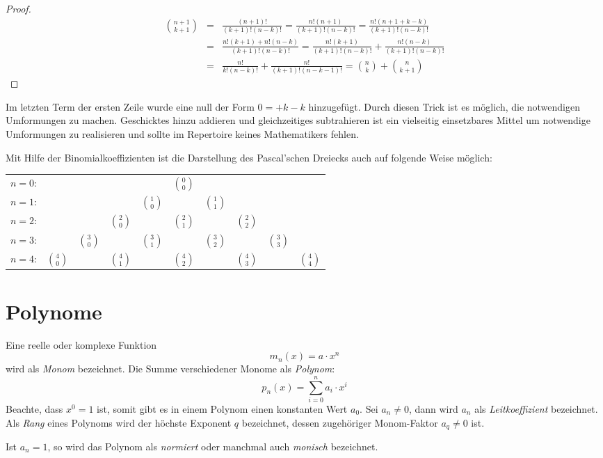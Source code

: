 \begin{proof}
\begin{eqnarray*}
\binom{n+1}{k+1} &=& \frac{(n+1)!}{(k+1)!(n-k)!} = \frac{n!(n+1)}{(k+1)!(n-k)!} = \frac{n!(n+1+k-k)}{(k+1)!(n-k)!} \\
&=& \frac{n!(k+1) +n!(n-k)}{(k+1)!(n-k)!} = \frac{n!(k+1)}{(k+1)!(n-k)!}+\frac{n!(n-k)}{(k+1)!(n-k)!} \\
&=& \frac{n!}{k!(n-k)!} + \frac{n!}{(k+1)!(n-k-1)!} = \binom{n}{k}+\binom{n}{k+1}
\end{eqnarray*}
\end{proof}

\HandRight \qquad Im letzten Term der ersten Zeile wurde eine null der Form $0=+k-k$ hinzugefügt. Durch diesen Trick ist es möglich, die notwendigen Umformungen zu machen. Geschicktes hinzu addieren und gleichzeitiges subtrahieren ist ein vielseitig einsetzbares Mittel um notwendige Umformungen zu realisieren und sollte im Repertoire keines Mathematikers fehlen. 

\bigskip

Mit Hilfe der Binomialkoeffizienten ist die Darstellung des Pascal'schen Dreiecks auch auf folgende Weise möglich:

\begin{center}
\begin{tabular}{rccccccccc} 
$n=0$:& & & & & $\binom{0}{0}$\\
\noalign{\smallskip} $n=1$:& & & & $\binom{1}{0}$ & & $\binom{1}{1}$\\
\noalign{\smallskip} $n=2$:& & & $\binom{2}{0}$ & & $\binom{2}{1}$ & & $\binom{2}{2}$\\
\noalign{\smallskip} $n=3$:& & $\binom{3}{0}$ & & $\binom{3}{1}$ & & $\binom{3}{2}$ & & $\binom{3}{3}$\\
\noalign{\smallskip} $n=4$:& $\binom{4}{0}$ & & $\binom{4}{1}$ & & $\binom{4}{2}$ & & $\binom{4}{3}$ & & $\binom{4}{4}$
\end{tabular}
\end{center}


\section{Polynome}\label{chap:poly}

\begin{definition}
Eine reelle oder komplexe Funktion
\[ m_n(x) = a\cdot x^n  \]
wird als \textsl{Monom} bezeichnet. Die Summe verschiedener Monome als \textsl{Polynom}:
\[
p_n(x) = \sum_{i=0}^{n} a_i \cdot x^i
\]
Beachte, dass $x^0 = 1$ ist, somit gibt es in einem Polynom einen konstanten Wert $a_0$. Sei $a_n\ne 0$, dann wird $a_n$ als \textsl{Leitkoeffizient} bezeichnet. Als \textsl{Rang} eines Polynoms wird der höchste Exponent $q$ bezeichnet, dessen zugehöriger Monom-Faktor $a_q \ne 0$ ist.

Ist $a_n = 1$, so wird das Polynom als \textsl{normiert} oder manchmal auch \textsl{monisch} bezeichnet.
\end{definition}


